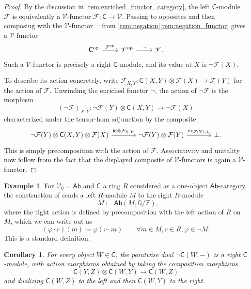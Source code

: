 \documentclass[11pt,onecolumn]{article}
\newcommand{\Z}{\mathbb{Z}}
\newcommand{\Q}{\mathbb{Q}}
\newcommand{\id}{\mathsf{id}}
\newcommand{\ev}{\mathrm{ev}}
\newcommand{\cV}{\mathscr{V}}
\newcommand{\cC}{\mathsf{C}}
\newcommand{\op}{\mathrm{op}}
\newcommand{\Ab}{\mathsf{Ab}}
\theoremstyle{plain}
\newtheorem{corollary}[corollary]{Corollary}
\theoremstyle{remark}
\theoremstyle{definition}
\newtheorem{example}[example]{Example}
\begin{document}
\begin{proof}
	By the discussion in \cref{rem:enriched_functor_category}, the left $\cC$-module $\mathcal{F}$ is equivalently a $\cV$-functor $\mathcal{F}\colon\cC\to\cV$.
	Passing to opposites and then composing with the $\cV$-functor $\neg$ from \cref{rem:negation}\ref{rem:negation_functor} gives a $\cV$-functor
	\[
		\begin{tikzcd}
			\cC^\op \ar[r, "\mathcal{F}^\op"] & \cV^\op \ar[r, "\neg"] & \cV.
		\end{tikzcd}
	\]
	Such a $\cV$-functor is precisely a right $\cC$-module, and its value at $X$ is $\neg\mathcal{F}(X)$.

	To describe its action concretely, write
	$\mathcal{F}_{X,Y}\colon\cC(X,Y)\otimes\mathcal{F}(X)\to\mathcal{F}(Y)$
	for the action of $\mathcal{F}$.
	Unwinding the enriched functor $\neg$, the action of $\neg\mathcal{F}$ is the morphism
	\[
		(\neg\mathcal{F})_{X,Y}\colon
		\neg\mathcal{F}(Y)\otimes\cC(X,Y)
		\longrightarrow
		\neg\mathcal{F}(X)
	\]
	characterized under the tensor-hom adjunction by the composite
	\[
		\begin{tikzcd}[column sep=large]
			\neg\mathcal{F}(Y)\otimes\cC(X,Y)\otimes\mathcal{F}(X)
			\ar[r, "\id\otimes\mathcal{F}_{X,Y}"]
			&
			\neg\mathcal{F}(Y)\otimes\mathcal{F}(Y)
			\ar[r, "\ev_{\mathcal{F}(Y),\bot}"]
			&
			\bot.
		\end{tikzcd}
	\]
	This is simply precomposition with the action of $\mathcal{F}$.
	Associativity and unitality now follow from the fact that the displayed composite of $\cV$-functors is again a $\cV$-functor.
\end{proof}

\begin{example}
	For $\cV_0 = \Ab$ and $\cC$ a ring $R$ considered as a one-object $\Ab$-category,
	the construction of  sends a left $R$-module $M$ to the right $R$-module
	\[
		\neg M \coloneqq \Ab(M, \Q/\Z),
	\]
	where the right action is defined by precomposition with the left action of $R$ on $M$,
	which we can write out as
	\begin{equation}
		\label{Ab_dual_module}
		(\varphi \cdot r)(m) \coloneqq \varphi(r \cdot m)
		\qquad \forall m \in M, r \in R, \varphi \in \neg M.
	\end{equation}
	This is a standard definition.
\end{example}

\begin{corollary}
	\label{cor:corepresentable_module}
	For every object $W \in \cC$, the pointwise dual $\neg \cC(W, -)$ is a right $\cC$-module, with action morphisms obtained by taking the composition morphisms
	\[
		\cC(Y,Z) \otimes \cC(W,Y)
		\longrightarrow
		\cC(W,Z)
	\]
	and dualizing $\cC(W,Z)$ to the left and then $\cC(W,Y)$ to the right.
\end{corollary}
\end{document}
